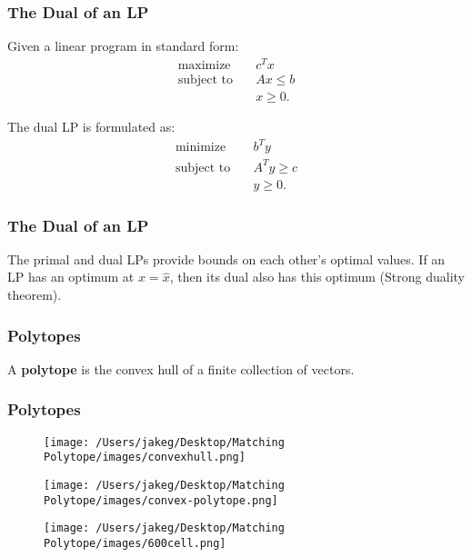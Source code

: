 \begin{frame}
    \frametitle{The Dual of an LP}

    Given a linear program in standard form:
    \begin{align*}
        \text{maximize} \quad & c^T x \\
        \text{subject to} \quad & Ax \leq b \\
                                & x \geq 0.
    \end{align*}

    The dual LP is formulated as:
    \begin{align*}
        \text{minimize} \quad & b^T y \\
        \text{subject to} \quad & A^T y \geq c \\
                                & y \geq 0.
    \end{align*}
\end{frame}

\begin{frame}
\frametitle{The Dual of an LP}
The primal and dual LPs provide bounds on each other’s optimal values. If an LP has an optimum at \(x = \hat{x}  \), then its dual also has this optimum (Strong duality theorem).
\end{frame}

\begin{frame}
\frametitle{Polytopes}
A \textbf{polytope} is the convex hull of a finite collection of vectors.
\end{frame}

\begin{frame}
\frametitle{Polytopes}
\begin{figure}
        \centering
        \begin{minipage}{0.32\textwidth}
            \centering
            \texttt{[image: /Users/jakeg/Desktop/Matching Polytope/images/convexhull.png]}
        \end{minipage}\hfill
        \begin{minipage}{0.32\textwidth}
            \centering
            \texttt{[image: /Users/jakeg/Desktop/Matching Polytope/images/convex-polytope.png]}
        \end{minipage}\hfill
        \begin{minipage}{0.32\textwidth}
            \centering
            \texttt{[image: /Users/jakeg/Desktop/Matching Polytope/images/600cell.png]}
        \end{minipage}
\end{figure}
\end{frame}

